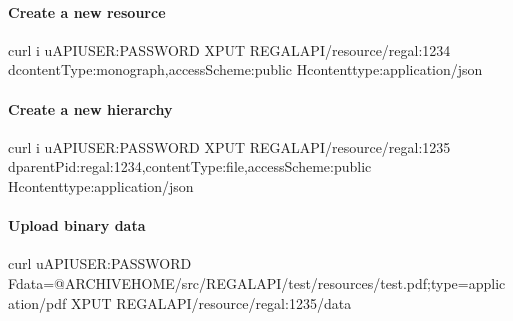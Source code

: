 \documentclass[letterpaper,10pt,english]{sphinxmanual}
\begin{document}
\paragraph{Create a new resource}
\label{\detokenize{api-toscience:create-a-new-resource}}\label{\detokenize{api-toscience:id3}}
\begin{sphinxVerbatim}[commandchars=\\\{\}]
curl \PYGZhy{}i \PYGZhy{}u\PYGZdl{}API\PYGZus{}USER:\PYGZdl{}PASSWORD \PYGZhy{}XPUT \PYGZdl{}REGAL\PYGZus{}API/resource/regal:1234 \PYGZhy{}d\PYGZsq{}\PYGZob{}\PYGZdq{}contentType\PYGZdq{}:\PYGZdq{}monograph\PYGZdq{},\PYGZdq{}accessScheme\PYGZdq{}:\PYGZdq{}public\PYGZdq{}\PYGZcb{}\PYGZsq{} \PYGZhy{}H\PYGZsq{}content\PYGZhy{}type:application/json\PYGZsq{}
\end{sphinxVerbatim}


\paragraph{Create a new hierarchy}
\label{\detokenize{api-toscience:create-a-new-hierarchy}}\label{\detokenize{api-toscience:id4}}
\begin{sphinxVerbatim}[commandchars=\\\{\}]
curl \PYGZhy{}i \PYGZhy{}u\PYGZdl{}API\PYGZus{}USER:\PYGZdl{}PASSWORD \PYGZhy{}XPUT \PYGZdl{}REGAL\PYGZus{}API/resource/regal:1235 \PYGZhy{}d\PYGZsq{}\PYGZob{}\PYGZdq{}parentPid\PYGZdq{}:\PYGZdq{}regal:1234\PYGZdq{},\PYGZdq{}contentType\PYGZdq{}:\PYGZdq{}file\PYGZdq{},\PYGZdq{}accessScheme\PYGZdq{}:\PYGZdq{}public\PYGZdq{}\PYGZcb{}\PYGZsq{} \PYGZhy{}H\PYGZsq{}content\PYGZhy{}type:application/json\PYGZsq{}
\end{sphinxVerbatim}


\paragraph{Upload binary data}
\label{\detokenize{api-toscience:upload-binary-data}}\label{\detokenize{api-toscience:id5}}
\begin{sphinxVerbatim}[commandchars=\\\{\}]
curl \PYGZhy{}u\PYGZdl{}API\PYGZus{}USER:\PYGZdl{}PASSWORD \PYGZhy{}F\PYGZdq{}data=@\PYGZdl{}ARCHIVE\PYGZus{}HOME/src/REGAL\PYGZus{}API/test/resources/test.pdf;type=application/pdf\PYGZdq{} \PYGZhy{}XPUT \PYGZdl{}REGAL\PYGZus{}API/resource/regal:1235/data
\end{sphinxVerbatim}
\end{document}
